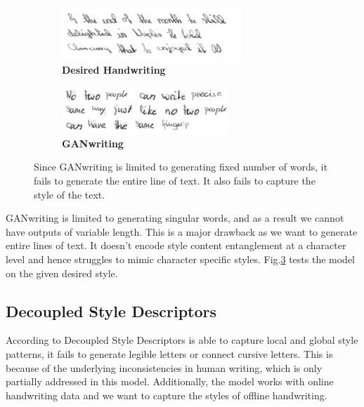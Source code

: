 \documentclass[10pt,twocolumn,letterpaper]{article}
\begin{document}
\begin{figure}[h]
  \centering
  \begin{subfigure}[b]{0.4\textwidth}
    \includegraphics[width=\textwidth]{../latex-src/Images/Gan-Input1.png}
    \caption{\textbf{Desired Handwriting}}
    \label{fig:GAN-input}
  \end{subfigure}
  \hfill
  \begin{subfigure}[b]{0.4\textwidth}
    \includegraphics[width=\textwidth]{../latex-src/Images/Gan-Output1.png}
    \caption{\textbf{GANwriting}}
    \label{fig:GAN-output}
  \end{subfigure}
  \caption{{Since GANwriting is limited to generating fixed number of words, it fails to generate the entire line of text. It also fails to capture the style of the text.}}
  \label{fig:GAN}
\end{figure}

GANwriting \cite{GAN-1} is limited to generating singular words, and as a result we cannot have outputs of variable length. This is a major drawback as we want to generate entire lines of text. It doesn't encode style content entanglement at a character level and hence struggles to mimic character specific styles. Fig.\ref{fig:GAN} tests the model on the given desired style.\\

\subsection*{Decoupled Style Descriptors}
According to \cite{BRUSH-paper} Decoupled Style Descriptors is able to capture local and global style patterns, it fails to generate legible letters or connect cursive letters. This is because of the underlying inconsistencies in human writing, which is only partially addressed in this model. Additionally, the model works with online handwriting data and we want to capture the styles of offline handwriting.\\
\end{document}
